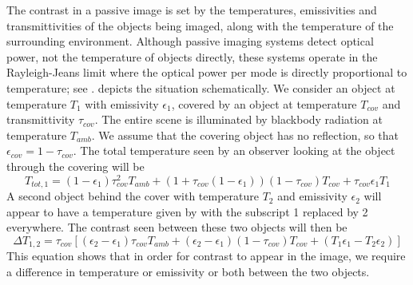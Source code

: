 The contrast in a passive image is set by the temperatures, emissivities and transmittivities of the objects being imaged, along with the temperature of the surrounding environment.
Although passive imaging systems detect optical power, not the temperature of objects directly, these systems operate in the Rayleigh-Jeans limit where the optical power per mode is directly proportional to temperature; see .
 depicts the situation schematically.
We consider an object at temperature $T_{1}$ with emissivity $\epsilon_1$, covered by an object at temperature $T_{cov}$ and transmittivity $\tau_{cov}$.
The entire scene is illuminated by blackbody radiation at temperature $T_{amb}$.
We assume that the covering object has no reflection, so that $\epsilon_{cov} = 1 - \tau_{cov}$.
The total temperature seen by an observer looking at the object through the covering will be
\begin{equation} \label{eqn:ch1-t-tot}
  T_{tot,1} = (1 - \epsilon_{1}) \tau_{cov}^2 T_{amb} + 
           (1 + \tau_{cov}(1 - \epsilon_{1}))(1-\tau_{cov}) T_{cov} + 
           \tau_{cov} \epsilon_{1} T_1
\end{equation}
A second object behind the cover with temperature $T_2$ and emissivity $\epsilon_2$ will appear to have a temperature given by  with the subscript 1 replaced by 2 everywhere.
The contrast seen between these two objects will then be
\begin{equation} \label{eqn:ch1-delta-t}
  \Delta T_{1,2} = \tau_{cov} \left[ (\epsilon_2 - \epsilon_1) \tau_{cov} T_{amb} + 
                                    (\epsilon_2 - \epsilon_1) (1-\tau_{cov}) T_{cov} + 
                                    (T_1 \epsilon_1 - T_2 \epsilon_2) \right]
\end{equation}
This equation shows that in order for contrast to appear in the image, we require a difference in temperature or emissivity or both between the two objects.

